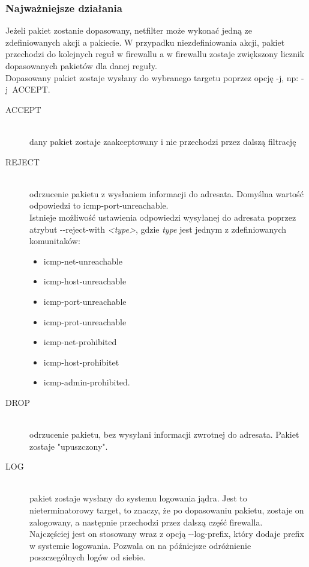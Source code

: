 \documentclass[a4paper,10pt,twoside]{book}
\newcommand{\param}[1]{\textit{\textless #1\textgreater}}
\begin{document}
			\subsubsection{Najważniejsze działania}
				Jeżeli pakiet zostanie dopasowany, netfilter może wykonać jedną ze zdefiniowanych akcji a pakiecie. W przypadku niezdefiniowania akcji, pakiet przechodzi do kolejnych reguł w firewallu a w firewallu zostaje zwiększony licznik dopasowanych pakietów dla danej reguły.\\
				Dopasowany pakiet zostaje wysłany do wybranego targetu poprzez opcję -j, np: -j~ACCEPT.
				\begin{description}
					\item[ACCEPT] \hfill \\
						dany pakiet zostaje zaakceptowany i nie przechodzi przez dalszą filtrację
					\item[REJECT] \hfill \\
						odrzucenie pakietu z wysłaniem informacji do adresata. Domyślna wartość odpowiedzi to icmp-port-unreachable.\\
						Istnieje możliwość ustawienia odpowiedzi wysyłanej do adresata poprzez atrybut -{}-reject-with \param{type},
						gdzie \textit{type} jest jednym z zdefiniowanych komunitaków:
						\begin{itemize}
							\item icmp-net-unreachable
							\item icmp-host-unreachable
							\item icmp-port-unreachable
							\item icmp-prot-unreachable
							\item icmp-net-prohibited
							\item icmp-host-prohibitet
							\item icmp-admin-prohibited.
						\end{itemize}
					\item[DROP] \hfill \\
						odrzucenie pakietu, bez wysyłani informacji zwrotnej do adresata. Pakiet zostaje "upuszczony".
					\item[LOG] \hfill \\
						pakiet zostaje wysłany do systemu logowania jądra. Jest to nieterminatorowy target, to znaczy, że po dopasowaniu pakietu, zostaje on zalogowany, a następnie przechodzi przez dalszą część firewalla.\\
						Najczęściej jest on stosowany wraz z opcją -{}-log-prefix, który dodaje prefix w systemie logowania. Pozwala on na późniejsze odróżnienie poszczególnych logów od siebie.

\end{description}
\end{document}
